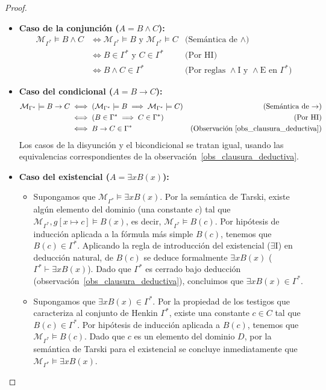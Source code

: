 \begin{proof}
\begin{itemize}
    \item \textbf{Caso de la conjunción ($A = B \land C$):}
    \begin{align*}
    \mathcal{M}_{\Gamma^*} \models B \land C &\iff \mathcal{M}_{\Gamma^*} \models B \text{ y } \mathcal{M}_{\Gamma^*} \models C & \text{(Semántica de $\land$)} \\
    &\iff B \in \Gamma^* \text{ y } C \in \Gamma^* & \text{(Por HI)} \\
    &\iff B \land C \in \Gamma^* & \text{(Por reglas $\land$I y $\land$E en $\Gamma^*$)}
    \end{align*}

    \item \textbf{Caso del condicional ($A = B \to C$):}
    \begin{align*}
    \mathcal{M}_{\Gamma^*} \models B \to C &\iff (\mathcal{M}_{\Gamma^*} \models B \implies \mathcal{M}_{\Gamma^*} \models C) & \text{(Semántica de $\to$)} \\
    &\iff (B \in \Gamma^* \implies C \in \Gamma^*) & \text{(Por HI)} \\
    &\iff B \to C \in \Gamma^* & \text{(Observación~\ref{obs_clausura_deductiva})}
    \end{align*}
    Los casos de la disyunción y el bicondicional se tratan igual, usando las equivalencias correspondientes de la observación~\ref{obs_clausura_deductiva}.

    \item \textbf{Caso del existencial ($A = \exists x B(x)$):}
    \begin{itemize}
        \item [$(\Rightarrow)$] Supongamos que $\mathcal{M}_{\Gamma^*} \models \exists x B(x)$. Por la semántica de Tarski, existe algún elemento del dominio (una constante $c$) tal que $\mathcal{M}_{\Gamma^*}, g[x \mapsto c] \models B(x)$, es decir, $\mathcal{M}_{\Gamma^*} \models B(c)$. Por hipótesis de inducción aplicada a la fórmula más simple $B(c)$, tenemos que $B(c) \in \Gamma^*$. Aplicando la regla de introducción del existencial ($\exists\text{I}$) en deducción natural, de $B(c)$ se deduce formalmente $\exists x B(x)$ ($\Gamma^* \vdash \exists x B(x)$). Dado que $\Gamma^*$ es cerrado bajo deducción (observación~\ref{obs_clausura_deductiva}), concluimos que $\exists x B(x) \in \Gamma^*$.
        \item [$(\Leftarrow)$] Supongamos que $\exists x B(x) \in \Gamma^*$. Por la propiedad de los testigos que caracteriza al conjunto de Henkin $\Gamma^*$, existe una constante $c \in C$ tal que $B(c) \in \Gamma^*$. Por hipótesis de inducción aplicada a $B(c)$, tenemos que $\mathcal{M}_{\Gamma^*} \models B(c)$. Dado que $c$ es un elemento del dominio $D$, por la semántica de Tarski para el existencial se concluye inmediatamente que $\mathcal{M}_{\Gamma^*} \models \exists x B(x)$.
    \end{itemize}


\end{itemize}
\end{proof}
